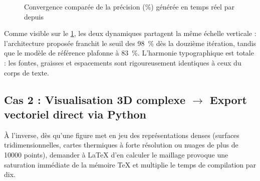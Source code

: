 \begin{figure}[htbp]
  \centering
  \caption[Courbes comparatives de précision générées depuis un CSV]{Convergence comparée de la précision (\%) générée en temps réel par  depuis }
  \label{fig:courbe-csv}
\end{figure}

Comme visible sur le \cref{fig:courbe-csv}, les deux dynamiques partagent la même échelle verticale :
l'architecture proposée franchit le seuil des \SI{98}{\percent} dès la douzième itération,
tandis que le modèle de référence plafonne à \SI{83}{\percent}.
L'harmonie typographique est totale : les fontes, graisses et espacements sont rigoureusement identiques à ceux du corps de texte.

\subsection[Cas 2 : Visualisation 3D complexe vers Export vectoriel direct]{Cas 2 : Visualisation 3D complexe \texorpdfstring{$\to$}{vers} Export vectoriel direct via Python}
\label{subsec:cas2-python3d}

À l'inverse, dès qu'une figure met en jeu des représentations denses (surfaces tridimensionnelles,
cartes thermiques à forte résolution ou nuages de plus de \num{10000} points),
demander à \LaTeX{} d'en calculer le maillage provoque une saturation immédiate de la mémoire TeX
et multiplie le temps de compilation par dix.

